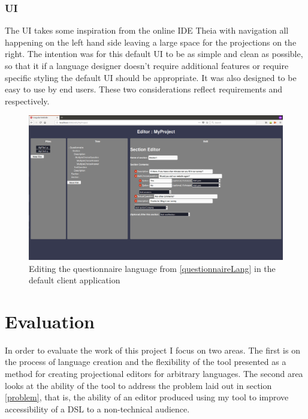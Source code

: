 \documentclass{article}
\begin{document}
\subsubsection{UI}
The UI takes some inspiration from the online IDE Theia\cite{theia} with navigation all happening on the left hand side leaving a large space for the projections on the right. The intention was for this default UI to be as simple and clean as possible, so that it if a language designer doesn't require additional features or require specific styling the default UI should be appropriate. It was also designed to be easy to use by end users. These two considerations reflect requirements \RSetup and \RIntuitive respectively.
\begin{figure}[h!]
  \centering
  \includegraphics[width=\linewidth]{./Screenshots/WebUIScreenshot.png}
  \caption{Editing the questionnaire language from \ref{questionnaireLang} in the default client application}
  \label{fig:webUI}
\end{figure}
%
%
\section{Evaluation}\label{evaluation}
In order to evaluate the work of this project I focus on two areas. The first is on the process of language creation and the flexibility of the tool presented as a method for creating projectional editors for arbitrary languages. The second area looks at the ability of the tool to address the problem laid out in section \ref{problem}, that is, the ability of an editor produced using my tool to improve accessibility of a DSL to a non-technical audience.
\end{document}
